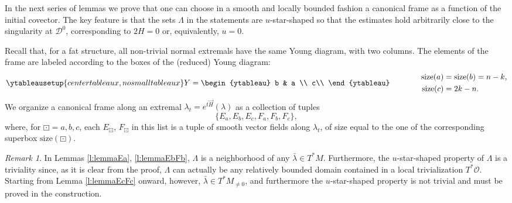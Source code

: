 \documentclass[11pt,a4paper]{article}
\theoremstyle{plain}
\theoremstyle{definition}
\theoremstyle{remark}
\newtheorem{remark}[theorem]{Remark}
\numberwithin{equation}{section}
\newcommand{\size}{\mathrm{size}}
\newcommand{\distr}{\mathscr{D}}
\begin{document}
In the next series of lemmas we prove that one can choose in a smooth and locally bounded fashion a canonical frame as a function of the initial covector. The key feature is that the sets $\Lambda$ in the statements are $u$-star-shaped so that the estimates hold arbitrarily close to the singularity at $\distr^0$, corresponding to $2H=0$ or, equivalently, $u=0$.


Recall that, for a fat structure, all non-trivial normal extremals have the same Young diagram, with two columns. The elements of the frame are labeled according to the boxes of the (reduced) Young diagram:
\begin{equation}
\ytableausetup{centertableaux,nosmalltableaux}
Y = \begin{ytableau}
b & a \\
c\\
\end{ytableau} \qquad\qquad \begin{aligned}
\size(a) & = \size(b) = n-k, \\ \size(c) & =2k-n.
\end{aligned}
\end{equation}
We organize a canonical frame along an extremal $\lambda_t=e^{t\vec{H}}(\lambda)$ as a collection of tuples
\begin{equation}
\{E_a,E_b,E_c,F_a,F_b,F_c\},
\end{equation}
where, for $\boxdot=a,b,c$, each $E_{\boxdot}$, $F_{\boxdot}$ in this list is a tuple of smooth vector fields along $\lambda_t$, of size equal to the one of the corresponding superbox $\size(\boxdot)$.

\begin{remark}
In Lemmas \ref{l:lemmaEa}, \ref{l:lemmaEbFb}, $\Lambda$ is a neighborhood of any $\bar{\lambda}\in T^*M$. Furthermore, the $u$-star-shaped property of $\Lambda$ is a triviality since, as it is clear from the proof, $\Lambda$ can actually be any relatively bounded domain contained in a local trivialization $T^*\mathcal{O}$. Starting from Lemma \ref{l:lemmaEcFc} onward, however, $\bar{\lambda} \in T^*M_{\neq 0}$, and furthermore the $u$-star-shaped property is not trivial and must be proved in the construction.
\end{remark}
\end{document}
